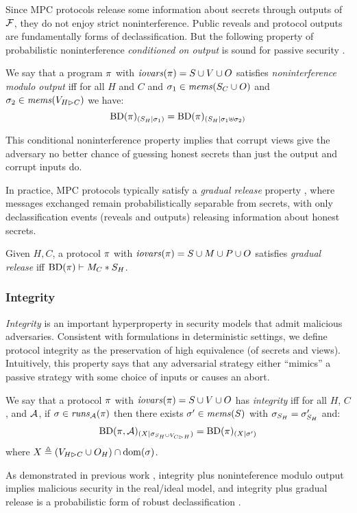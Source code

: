 Since MPC protocols release some information about secrets through
outputs of $\mathcal{F}$, they do not enjoy strict noninterference.
Public reveals and protocol outputs are fundamentally forms of
declassification. But the following property of probabilistic
noninterference \emph{conditioned on output} is sound for passive
security \cite{skalka-near-ppdp24}.
\begin{definition}
  \label{definition-NIMO}
  We say that a program $\pi$ with $\mathit{iovars}(\pi) = S \cup V \cup O$
  satisfies \emph{noninterference modulo output}
  iff for all $H$ and $C$ and $\sigma_1 \in \mathit{mems}(S_C \cup O)$ and $\sigma_2 \in \mathit{mems}(V_{H \rhd C})$
  we have:
  $$
  \mathrm{BD}(\pi)_{({S_H}|{\sigma_1})} = \mathrm{BD}(\pi)_{({S_H}|{\sigma_1 \uplus \sigma_2})}
 $$
\end{definition}
This conditional noninterference property implies that
corrupt views give the adversary no better chance of guessing honest
secrets than just the output and corrupt inputs do.

In practice, MPC protocols typically satisfy a \emph{gradual
release} property \cite{sabelfeld2009declassification}, where messages
exchanged remain probabilistically separable from secrets, with only
declassification events (reveals and outputs) releasing information
about honest secrets.  
\begin{definition}
  Given $H,C$, a protocol $\pi$ with $\mathit{iovars}(\pi) = S \cup M \cup P \cup O$
  satisfies \emph{gradual release} iff
  $\mathrm{BD}(\pi) \vdash M_C * S_H$.
\end{definition}

\subsubsection{Integrity}

\emph{Integrity} is an important hyperproperty in security models that
admit malicious adversaries. Consistent with formulations in
deterministic settings, we define protocol integrity as the
preservation of high equivalence (of secrets and views). Intuitively,
this property says that any adversarial strategy either ``mimics'' a
passive strategy with some choice of inputs or causes an abort.
\begin{definition}[Integrity]
  \label{def-integrity}
  We say that a protocol $\pi$ with $\mathit{iovars}(\pi) = S \cup V \cup O$ has
  \emph{integrity} iff for all $H$, $C$, and $\mathcal{A}$,
  if $\sigma \in \mathit{runs}_{\mathcal{A}}(\pi)$ 
  then there exists $\sigma' \in \mathit{mems}(S)$ with $\sigma_{S_H} = \sigma'_{S_H} $ and:
    $$
    \mathrm{BD}(\pi,\mathcal{A})_{({X}|{\sigma_{S_H \cup V_{C \rhd H}}})} =
    \mathrm{BD}(\pi)_{({X}|{\sigma'})}
    $$ 
  where $X \triangleq (V_{H \rhd C} \cup O_H) \cap \mathrm{dom}(\sigma)$. 
\end{definition}
As demonstrated in previous work \cite{skalka-near-ppdp24}, integrity
plus noninteference modulo output implies malicious security in the
real/ideal model, and integrity plus gradual release is a
probabilistic form of robust declassification
\cite{sabelfeld2009declassification}.



